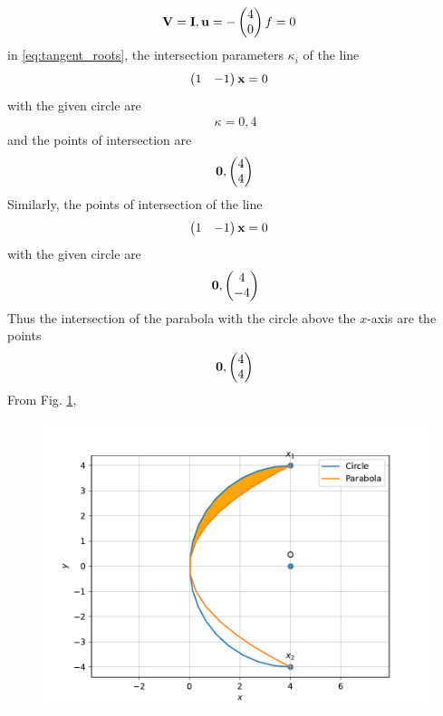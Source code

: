 \documentclass[journal,12pt,twocolumn]{IEEEtran}
\renewcommand\thesection{\arabic{section}}
\begin{document}
\begin{enumerate}[label=\thesection.\arabic*.,ref=\thesection.\theenumi]
\begin{align}
	\\
	\mathbf{V} &= \mathbf{I},
	\mathbf{u} = -\begin{pmatrix}4 \\0\end{pmatrix}
	f = 0
\end{align}
in 
\eqref{eq:tangent_roots}, the intersection parameters $\kappa_i$ of the line 
\begin{align}
	\begin{pmatrix}1 & - 1\end{pmatrix}\mathbf{x} &= 0
\end{align}
with the given circle are
\begin{align}
\kappa = 0, 4 
\end{align}
and the points of intersection are 
\begin{align}
	\mathbf{0}, \begin{pmatrix}4 \\ 4\end{pmatrix}
\end{align}
Similarly, 
the points of intersection of the line 
\begin{align}
	\begin{pmatrix}1 & - 1\end{pmatrix}\mathbf{x} &= 0
\end{align}
with the given circle are 
\begin{align}
	\mathbf{0}, \begin{pmatrix}4 \\ -4\end{pmatrix}
\end{align}
%
Thus the intersection of the parabola with the circle above the $x$-axis are the points 
\begin{align}
	\mathbf{0}, \begin{pmatrix}4 \\ 4\end{pmatrix}
\end{align}
From Fig. 
	\ref{fig:matrix-12-15},
\begin{figure}[!ht]
	\centering
	\includegraphics[width=\columnwidth]{figs/matrix-12-15.pdf}
	\caption{}
	\label{fig:matrix-12-15}
\end{figure}

\end{enumerate}
\end{document}
